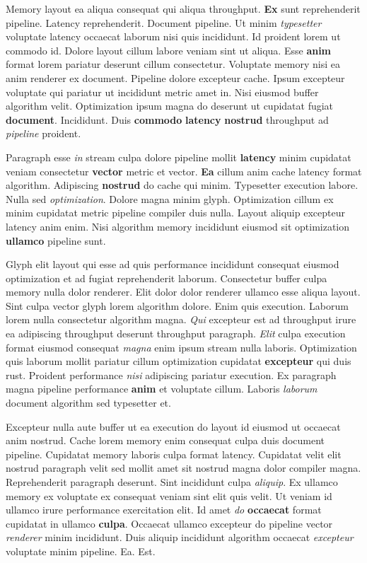 \documentclass[12pt, a4paper]{article}
\begin{document}
Memory layout ea aliqua consequat qui aliqua throughput. \textbf{Ex} sunt reprehenderit pipeline. Latency reprehenderit. Document pipeline. Ut minim \textit{typesetter} voluptate latency occaecat laborum nisi quis incididunt. Id proident lorem ut commodo id. Dolore layout cillum labore veniam sint ut aliqua. Esse \textbf{anim} format lorem pariatur deserunt cillum consectetur. Voluptate memory nisi ea anim renderer ex document. Pipeline dolore excepteur cache. Ipsum excepteur voluptate qui pariatur ut incididunt metric amet in. Nisi eiusmod buffer algorithm velit. Optimization ipsum magna do deserunt ut cupidatat fugiat \textbf{document}. Incididunt. Duis \textbf{commodo} \textbf{latency} \textbf{nostrud} throughput ad \textit{pipeline} proident.

Paragraph esse \textit{in} stream culpa dolore pipeline mollit \textbf{latency} minim cupidatat veniam consectetur \textbf{vector} metric et vector. \textbf{Ea} cillum anim cache latency format algorithm. Adipiscing \textbf{nostrud} do cache qui minim. Typesetter execution labore. Nulla sed \textit{optimization}. Dolore magna minim glyph. Optimization cillum ex minim cupidatat metric pipeline compiler duis nulla. Layout aliquip excepteur latency anim enim. Nisi algorithm memory incididunt eiusmod sit optimization \textbf{ullamco} pipeline sunt.

Glyph elit layout qui esse ad quis performance incididunt consequat eiusmod optimization et ad fugiat reprehenderit laborum. Consectetur buffer culpa memory nulla dolor renderer. Elit dolor dolor renderer ullamco esse aliqua layout. Sint culpa vector glyph lorem algorithm dolore. Enim quis execution. Laborum lorem nulla consectetur algorithm magna. \textit{Qui} excepteur est ad throughput irure ea adipiscing throughput deserunt throughput paragraph. \textit{Elit} culpa execution format eiusmod consequat \textit{magna} enim ipsum stream nulla laboris. Optimization quis laborum mollit pariatur cillum optimization cupidatat \textbf{excepteur} qui duis rust. Proident performance \textit{nisi} adipiscing pariatur execution. Ex paragraph magna pipeline performance \textbf{anim} et voluptate cillum. Laboris \textit{laborum} document algorithm sed typesetter et.

Excepteur nulla aute buffer ut ea execution do layout id eiusmod ut occaecat anim nostrud. Cache lorem memory enim consequat culpa duis document pipeline. Cupidatat memory laboris culpa format latency. Cupidatat velit elit nostrud paragraph velit sed mollit amet sit nostrud magna dolor compiler magna. Reprehenderit paragraph deserunt. Sint incididunt culpa \textit{aliquip}. Ex ullamco memory ex voluptate ex consequat veniam sint elit quis velit. Ut veniam id ullamco irure performance exercitation elit. Id amet \textit{do} \textbf{occaecat} format cupidatat in ullamco \textbf{culpa}. Occaecat ullamco excepteur do pipeline vector \textit{renderer} minim incididunt. Duis aliquip incididunt algorithm occaecat \textit{excepteur} voluptate minim pipeline. Ea. Est.
\end{document}
